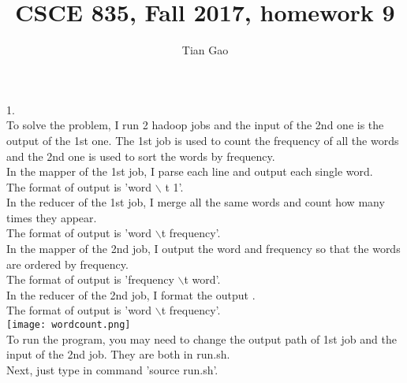 \documentclass[a4paper]{article}
\title{CSCE 835, Fall 2017, homework 9}
\author{Tian Gao}
\begin{document}
\maketitle


1.\\
To solve the problem, I run 2 hadoop jobs and the input of the 2nd one is the output of the 1st one. The 1st job is used to count the frequency of all the words and the 2nd one is used to sort the words by frequency.\\
In the mapper of the 1st job, I parse each line and output each single word.\\
The format of output is 'word $\backslash$ t 1'.\\
In the reducer of the 1st job, I merge all the same words and count how many times they appear.\\
The format of output is 'word $\backslash$t frequency'.\\
In the mapper of the 2nd job, I output the word and frequency so that the words are ordered by frequency.\\
The format of output is 'frequency $\backslash$t word'.\\
In the reducer of the 2nd job, I format the output .\\
The format of output is 'word $\backslash$t frequency'.\\
\texttt{[image: wordcount.png]}\\
To run the program, you may need to change the output path of 1st job and the input of the 2nd job. They are both in run.sh.\\
Next, just type in command 'source run.sh'.\\
\end{document}
